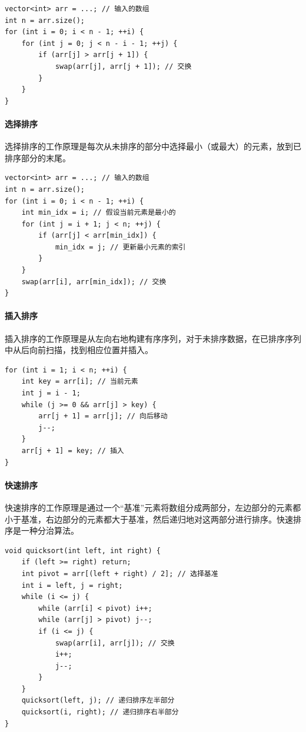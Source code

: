 \begin{verbatim}
vector<int> arr = ...; // 输入的数组
int n = arr.size();
for (int i = 0; i < n - 1; ++i) {
    for (int j = 0; j < n - i - 1; ++j) {
        if (arr[j] > arr[j + 1]) {
            swap(arr[j], arr[j + 1]); // 交换
        }
    }
}
\end{verbatim}

\paragraph{选择排序} 选择排序的工作原理是每次从未排序的部分中选择最小（或最大）的元素，放到已排序部分的末尾。
\begin{verbatim}
vector<int> arr = ...; // 输入的数组
int n = arr.size();
for (int i = 0; i < n - 1; ++i) {
    int min_idx = i; // 假设当前元素是最小的
    for (int j = i + 1; j < n; ++j) {
        if (arr[j] < arr[min_idx]) {
            min_idx = j; // 更新最小元素的索引
        }
    }
    swap(arr[i], arr[min_idx]); // 交换
}
\end{verbatim}

\paragraph{插入排序} 插入排序的工作原理是从左向右地构建有序序列，对于未排序数据，在已排序序列中从后向前扫描，找到相应位置并插入。

\begin{verbatim}
for (int i = 1; i < n; ++i) {
    int key = arr[i]; // 当前元素
    int j = i - 1;
    while (j >= 0 && arr[j] > key) {
        arr[j + 1] = arr[j]; // 向后移动
        j--;
    }
    arr[j + 1] = key; // 插入
}
\end{verbatim}

\paragraph{快速排序} 快速排序的工作原理是通过一个“基准”元素将数组分成两部分，左边部分的元素都小于基准，右边部分的元素都大于基准，然后递归地对这两部分进行排序。快速排序是一种分治算法。

\begin{verbatim}
void quicksort(int left, int right) {
    if (left >= right) return;
    int pivot = arr[(left + right) / 2]; // 选择基准
    int i = left, j = right;
    while (i <= j) {
        while (arr[i] < pivot) i++;
        while (arr[j] > pivot) j--;
        if (i <= j) {
            swap(arr[i], arr[j]); // 交换
            i++;
            j--;
        }
    }
    quicksort(left, j); // 递归排序左半部分
    quicksort(i, right); // 递归排序右半部分
}
\end{verbatim}

